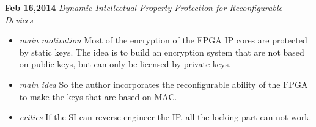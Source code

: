 \documentclass[]{article}
\begin{document}
\noindent \textbf{Feb 16,2014}
\textit{Dynamic Intellectual Property Protection for Reconfigurable Devices}
\indent		\begin{itemize}
            \item \textit{main motivation} Most of the encryption of the FPGA IP
            cores are protected by static keys. The idea is to build an
            encryption system that are not based on public keys, but can only be
            licensed by private keys.
            \item \textit{main idea} So the author incorporates the
            reconfigurable ability of the FPGA to make the keys that are based
            on MAC.
            \item \textit{critics} If the SI can reverse engineer the IP, all
            the locking part can not work.
        \end{itemize}
\end{document}
